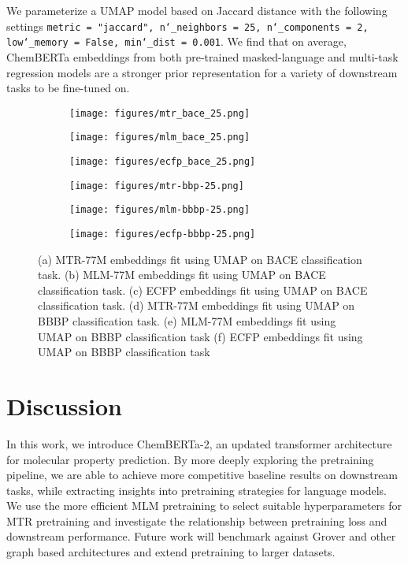 \documentclass{article}
\begin{document}
We parameterize a UMAP model based on Jaccard distance with the following settings \texttt{metric = "jaccard", n\char`_neighbors = 25, n\char`_components = 2, low\char`_memory = False, min\char`_dist = 0.001}. We find that on average, ChemBERTa embeddings from both pre-trained masked-language and multi-task regression models are a stronger prior representation for a variety of downstream tasks to be fine-tuned on.

\begin{figure}[h!]
  \begin{subfigure}[b]{0.32\textwidth}
    \texttt{[image: figures/mtr\_bace\_25.png]}
    \caption{ }
    \label{fig:1}
  \end{subfigure}
\begin{subfigure}[b]{0.32\textwidth}
\texttt{[image: figures/mlm\_bace\_25.png]}
    \caption{ }
    \label{fig:2}
  \end{subfigure}
  \begin{subfigure}[b]{0.32\textwidth}
\texttt{[image: figures/ecfp\_bace\_25.png]}
    \caption{ }
    \label{fig:3}
  \end{subfigure}
  \begin{subfigure}[b]{0.32\textwidth}
\texttt{[image: figures/mtr-bbp-25.png]}
    \caption{ }
    \label{fig:4}
  \end{subfigure}
  \begin{subfigure}[b]{0.32\textwidth}
\texttt{[image: figures/mlm-bbbp-25.png]}
    \caption{ }
    \label{fig:5}
  \end{subfigure}  
  \begin{subfigure}[b]{0.32\textwidth}
\texttt{[image: figures/ecfp-bbbp-25.png]}
    \caption{ }
    \label{fig:6}
  \end{subfigure}


  \caption{(a) MTR-77M embeddings fit using UMAP on BACE classification task. (b) MLM-77M embeddings fit using UMAP on BACE classification task. (c) ECFP embeddings fit using UMAP on BACE classification task. (d) MTR-77M embeddings fit using UMAP on BBBP classification task. (e) MLM-77M embeddings fit using UMAP on BBBP classification task (f) ECFP embeddings fit using UMAP on BBBP classification task}
\end{figure}

\section{Discussion}
In this work, we introduce ChemBERTa-2, an updated transformer architecture for molecular property prediction. By more deeply exploring the pretraining pipeline, we are able to achieve more competitive baseline results on downstream tasks, while extracting insights into pretraining strategies for language models. We use the more efficient MLM pretraining to select suitable hyperparameters for MTR pretraining and investigate the relationship between pretraining loss and downstream performance. Future work will benchmark against Grover and other graph based architectures and extend pretraining to larger datasets.
\end{document}
